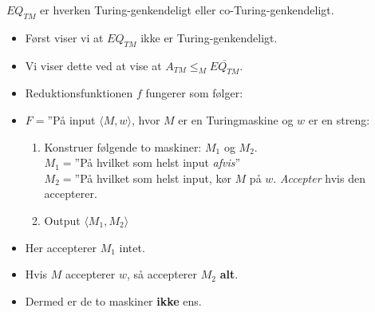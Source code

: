 \begin{frame}[allowframebreaks]
	\begin{theorem}
		$EQ_{TM}$ er hverken Turing-genkendeligt eller co-Turing-genkendeligt.
	\end{theorem}
	\begin{itemize}
		\item Først viser vi at $EQ_{TM}$ ikke er Turing-genkendeligt.
		\item Vi viser dette ved at vise at $A_{TM} \le_{M} \overline{EQ_{TM}}$.
		\item Reduktionsfunktionen $f$ fungerer som følger:
		\item $F =$''På input \(\langle M, w \rangle\), hvor $M$ er en Turingmaskine og $w$ er en streng:
		      \begin{enumerate}
			      \item Konstruer følgende to maskiner: $M_{1}$ og $M_{2}$.\\
			            $M_{1} = $''På hvilket som helst input \textit{afvis}'' \\
			            $M_{2} =$''På hvilket som helst input, kør $M$ på $w$. \textit{Accepter} hvis den accepterer.\\
			      \item Output \(\langle M_{1}, M_{2} \rangle \)
		      \end{enumerate}
		\item Her accepterer $M_{1}$ intet.
		\item Hvis $M$ accepterer $w$, så accepterer $M_{2}$ \textbf{alt}.
		\item Dermed er de to maskiner \textbf{ikke} ens.
	\end{itemize}
\end{frame}




